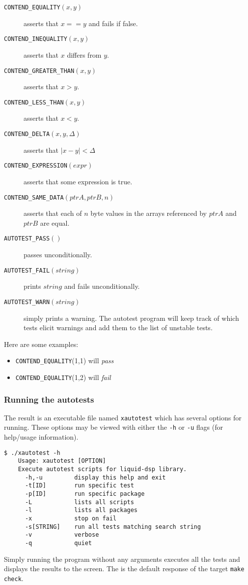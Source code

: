 \begin{description}
\item[{\tt CONTEND\_EQUALITY}$(x,y)$] asserts that $x==y$ and fails if
false.
\item[{\tt CONTEND\_INEQUALITY}$(x,y)$] asserts that $x$ differs from
$y$.
\item[{\tt CONTEND\_GREATER\_THAN}$(x,y)$] asserts that $x>y$.
\item[{\tt CONTEND\_LESS\_THAN}$(x,y)$] asserts that $x<y$.
\item[{\tt CONTEND\_DELTA}$(x,y,\Delta)$] asserts that $|x-y|<\Delta$
\item[{\tt CONTEND\_EXPRESSION}$(expr)$] asserts that some expression is
true.
\item[{\tt CONTEND\_SAME\_DATA}$(ptrA,ptrB,n)$] asserts that each of $n$
byte values in the arrays referenced by $ptrA$ and $ptrB$ are equal.
\item[{\tt AUTOTEST\_PASS}$()$] passes unconditionally.
\item[{\tt AUTOTEST\_FAIL}$(string)$] prints $string$ and fails
unconditionally.
\item[{\tt AUTOTEST\_WARN}$(string)$] simply prints a warning.
The autotest program will keep track of which tests elicit warnings and add
them to the list of unstable tests.
\end{description}

Here are some examples:
\begin{itemize}
\item[] {\tt CONTEND\_EQUALITY}(1,1) will {\it pass}
\item[] {\tt CONTEND\_EQUALITY}(1,2) will {\it fail}
\end{itemize}

\subsubsection{Running the autotests}
The result is an executable file named {\tt xautotest} which has several
options for running.
These options may be viewed with either the {\tt -h} or {\tt -u} flags (for
help/usage information).
%
\begin{Verbatim}[fontsize=\small]
    $ ./xautotest -h
    Usage: xautotest [OPTION]
    Execute autotest scripts for liquid-dsp library.
      -h,-u         display this help and exit
      -t[ID]        run specific test
      -p[ID]        run specific package
      -L            lists all scripts
      -l            lists all packages
      -x            stop on fail
      -s[STRING]    run all tests matching search string
      -v            verbose
      -q            quiet
\end{Verbatim}
%
Simply running the program without any arguments executes all the tests and
displays the results to the screen.
The is the default response of the target {\tt make check}.

